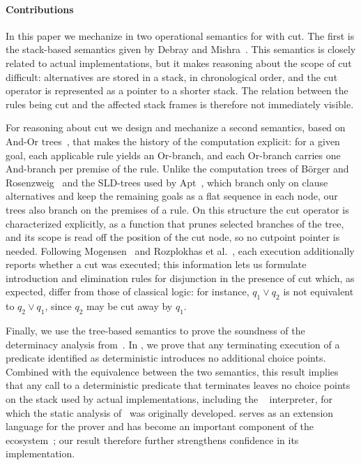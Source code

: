 \documentclass[sigplan,10pt,anonymous,review]{acmart}
\begin{document}
\paragraph{Contributions}
In this paper we mechanize in \rocqP{} two operational semantics for
\prologP with cut. The first is the stack-based semantics given by Debray
and Mishra~\cite{Debray1988}. This semantics is closely related to actual \prologP
implementations, but it makes reasoning about the scope of cut difficult:
alternatives are stored in a stack, in chronological order, and the cut
operator is represented as a pointer to a shorter stack. The relation
between the rules being cut and the affected stack frames is therefore not
immediately visible.

For reasoning about cut we design and mechanize a second semantics, based on
And-Or trees~\cite{Kowalski1979}, that makes the history of the computation explicit: for a given
goal, each applicable rule yields an Or-branch, and each Or-branch carries one
And-branch per premise of the rule. Unlike the computation trees of B\"orger and
Rosenzweig~\cite{Borger1989,BorgerRosenzweig1995} and the SLD-trees used by
Apt~\cite{Apt1990}, which branch only on clause alternatives and keep the
remaining goals as a flat sequence in each node, our trees also branch on the
premises of a rule. On this structure the cut operator is characterized
explicitly, as a function that prunes selected branches of the tree, and its
scope is read off the position of the cut node, so no cutpoint pointer is
needed. Following Mogensen~\cite{1996mogensen} and Rozplokhas et al.~\cite{miniKanren}, 
each execution additionally reports
whether a cut was executed; this information lets us formulate introduction and
elimination rules for disjunction in the presence of cut which, as expected,
differ from those of classical logic: for instance, $q_1 \lor q_2$ is not
equivalent to $q_2 \lor q_1$, since $q_2$ may be cut away by $q_1$.

Finally, we use the tree-based semantics to prove the soundness of the
determinacy analysis from~\cite{fissore2026}. In \rocqP{}, we prove that any
terminating execution of a predicate identified as deterministic introduces no
additional choice points. Combined with the equivalence
between the two semantics, this result implies that any call to a
deterministic predicate that terminates leaves no choice points on the stack used by
actual \prologP implementations, including the
\elpiP~\cite{dunchev15lpar} \lprologP{} interpreter, for which the
static analysis of~\cite{fissore2026} was originally developed. \elpiP
serves as an extension language for the \rocqP{} prover and has become an
important component of the \rocqP{} ecosystem~\cite{krebbers25,Trakt,Maas2024,fissore2023,fissore2024,cohen_et_al:LIPIcs.FSCD.2020.34,Trocq,TrocqJ,tassi2018,tassi2019,tassi2023};
our result therefore further strengthens confidence in its
implementation.
\end{document}
